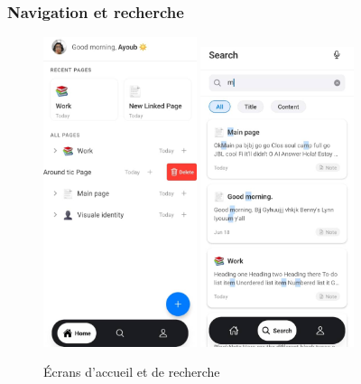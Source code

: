 \subsubsection{Navigation et recherche}
\begin{figure}[H]
    \centering
    \includegraphics[width=0.4\textwidth]{assets/docs/mobile/home-screen.png}
    \hfill
    \includegraphics[width=0.4\textwidth]{assets/docs/mobile/search-screeen.png}
    \caption{Écrans d'accueil et de recherche}
    \label{fig:mobile-home-search}
\end{figure}

